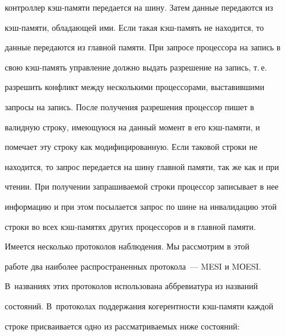 контроллер кэш-памяти передается на шину. Затем данные передаются из 


кэш-памяти, обладающей ими. Если такая кэш-память не находится, то 


данные передаются из главной памяти. При запросе процессора на запись в 


свою кэш-память управление  должно выдать разрешение на запись, т.\,е.\ 


разрешить конфликт между несколькими процессорами, выставившими 


запросы на запись. После получения разрешения процессор пишет в 


валидную строку, имеющуюся на данный момент в его кэш-памяти, и 


помечает эту строку как модифицированную. Если таковой  строки не 


находится, то запрос передается на шину главной памяти, так же как и при 


чтении. При получении запрашиваемой строки процессор записывает в нее 


информацию и при этом посылается запрос по шине на инвалидацию этой 


строки во всех кэш-памятях других процессоров и в главной памяти.


      


      Имеется несколько протоколов наблюдения. Мы рассмотрим в этой 


работе два наиболее распространенных протокола~--- MESI и MОESI. 


В~названиях этих протоколов использована аббревиатура из названий 


состояний. В~протоколах поддержания когерентности кэш-памяти каждой 


строке присваивается одно из рассматриваемых ниже состояний:


